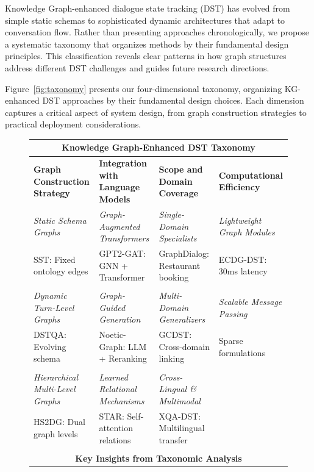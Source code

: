 \documentclass[11pt]{article}
\begin{document}
Knowledge Graph-enhanced dialogue state tracking (DST) has evolved from simple static schemas to sophisticated dynamic architectures that adapt to conversation flow. Rather than presenting approaches chronologically, we propose a systematic taxonomy that organizes methods by their fundamental design principles. This classification reveals clear patterns in how graph structures address different DST challenges and guides future research directions.

Figure~\ref{fig:taxonomy} presents our four-dimensional taxonomy, organizing KG-enhanced DST approaches by their fundamental design choices. Each dimension captures a critical aspect of system design, from graph construction strategies to practical deployment considerations.

\begin{figure}[t]
\centering
\begin{tabular}{|p{3.5cm}|p{3.5cm}|p{3.5cm}|p{3.5cm}|}
\hline
\multicolumn{4}{|c|}{\textbf{\Large Knowledge Graph-Enhanced DST Taxonomy}} \\
\hline
\hline
\textbf{Graph Construction Strategy} & \textbf{Integration with Language Models} & \textbf{Scope and Domain Coverage} & \textbf{Computational Efficiency} \\
\hline
\hline
\textit{Static Schema Graphs} & \textit{Graph-Augmented Transformers} & \textit{Single-Domain Specialists} & \textit{Lightweight Graph Modules} \\
\small{SST: Fixed ontology edges} & \small{GPT2-GAT: GNN + Transformer} & \small{GraphDialog: Restaurant booking} & \small{ECDG-DST: 30ms latency} \\
& & & \\
\hline
\textit{Dynamic Turn-Level Graphs} & \textit{Graph-Guided Generation} & \textit{Multi-Domain Generalizers} & \textit{Scalable Message Passing} \\
\small{DSTQA: Evolving schema} & \small{Noetic-Graph: LLM + Reranking} & \small{GCDST: Cross-domain linking} & \small{Sparse formulations} \\
& & & \\
\hline
\textit{Hierarchical Multi-Level Graphs} & \textit{Learned Relational Mechanisms} & \textit{Cross-Lingual \& Multimodal} & \\
\small{HS2DG: Dual graph levels} & \small{STAR: Self-attention relations} & \small{XQA-DST: Multilingual transfer} & \\
& & & \\
\hline
\hline
\multicolumn{4}{|c|}{\textbf{Key Insights from Taxonomic Analysis}} \\

\end{tabular}
\end{figure}
\end{document}
